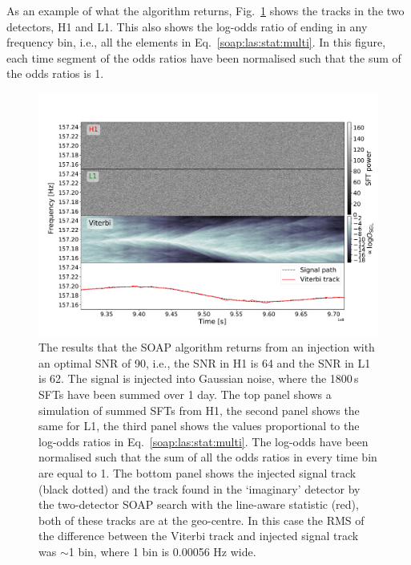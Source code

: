%
%
As an example of what the algorithm returns, Fig.~\ref{soap:tracks} shows
the tracks in the two detectors, H1 and L1. This also shows the
log-odds ratio of ending in any
frequency bin, i.e., all the elements in Eq.~\ref{soap:las:stat:multi}.  In this figure, each time segment of the odds ratios have been normalised such that the sum of the odds ratios is 1.



\begin{figure}
\includegraphics[scale=0.45]{C3_soap/viterbi_tracks.pdf}
%
\caption[Example of SOAP algorithms and outputs when run on H1 and L1 spectrograms.]{\label{soap:tracks} The results that the SOAP algorithm returns from an injection with an optimal
\gls{SNR} of 90, i.e., the \gls{SNR} in H1 is 64 and the \gls{SNR} in L1 is 62.
The signal is injected into Gaussian noise, where the 1800\,s \glspl{SFT} have been
summed over 1 day.  The top panel shows a simulation of summed \glspl{SFT} from H1, the second panel shows the same for L1,
the third panel shows the values proportional to the
log-odds ratios in Eq.~\ref{soap:las:stat:multi}.
The log-odds have been normalised such that the sum of
all the odds ratios in every time bin are equal to 1. The bottom panel shows the injected signal track (black dotted) and the track found in the `imaginary' detector by the two-detector SOAP search with the line-aware statistic (red), both of these tracks are at the geo-centre. In this case the \gls{RMS} of the difference between the Viterbi track and injected signal track was $\sim$1 bin, where 1 bin is 0.00056 Hz wide.}
%
\end{figure}



